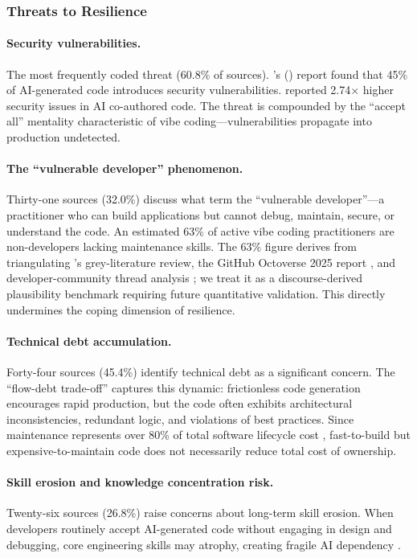 \documentclass[preprint,12pt,authoryear]{elsarticle}
\begin{document}
\subsubsection{Threats to Resilience}

\paragraph{Security vulnerabilities.} The most frequently coded threat (60.8\% of sources). \citeauthor{Veracode2025}'s (\citeyear{Veracode2025}) report found that 45\% of AI-generated code introduces security vulnerabilities. \citet{CodeRabbit2025} reported 2.74$\times$ higher security issues in AI co-authored code. The threat is compounded by the ``accept all'' mentality characteristic of vibe coding---vulnerabilities propagate into production undetected.

\paragraph{The ``vulnerable developer'' phenomenon.} Thirty-one sources (32.0\%) discuss what \citet{Fawzy2025} term the ``vulnerable developer''---a practitioner who can build applications but cannot debug, maintain, secure, or understand the code. An estimated 63\% of active vibe coding practitioners are non-developers lacking maintenance skills. The 63\% figure derives from triangulating \citet{Fawzy2025}'s grey-literature review, the GitHub Octoverse 2025 report \citep{GitHub2025}, and developer-community thread analysis \citep{Reddit2025}; we treat it as a discourse-derived plausibility benchmark requiring future quantitative validation. This directly undermines the coping dimension of resilience.

\paragraph{Technical debt accumulation.} Forty-four sources (45.4\%) identify technical debt as a significant concern. The ``flow-debt trade-off'' \citep{VibeCodingFlowDebt2025} captures this dynamic: frictionless code generation encourages rapid production, but the code often exhibits architectural inconsistencies, redundant logic, and violations of best practices. Since maintenance represents over 80\% of total software lifecycle cost \citep{Pressman2020}, fast-to-build but expensive-to-maintain code does not necessarily reduce total cost of ownership.

\paragraph{Skill erosion and knowledge concentration risk.} Twenty-six sources (26.8\%) raise concerns about long-term skill erosion. When developers routinely accept AI-generated code without engaging in design and debugging, core engineering skills may atrophy, creating fragile AI dependency \citep{Fawzy2025, DEVCommunity2025}.
\end{document}

